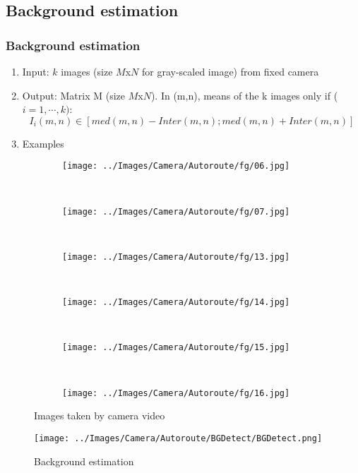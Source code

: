 \subsection{Background estimation}
\begin{frame}[allowframebreaks]
	\frametitle{Background estimation }
	\begin{enumerate}
	\item Input: $k$ images (size $M$x$N$ for gray-scaled image) from fixed camera
	\item Output: Matrix M (size $M$x$N$). In (m,n), means  of the k images only if ($i = 1,\cdots, k)$:	
	$$I_i (m,n) \in [med(m,n) - Inter(m,n); med(m,n) + Inter(m,n)]$$
    \item Examples
	\end{enumerate}

\begin{figure}[h]
\centering
\begin{subfigure}{0.20\textwidth}
\texttt{[image: ../Images/Camera/Autoroute/fg/06.jpg]}
\end{subfigure}
~
\begin{subfigure}{0.20\textwidth}
\texttt{[image: ../Images/Camera/Autoroute/fg/07.jpg]}
\end{subfigure}
~
\begin{subfigure}{0.20\textwidth}
\texttt{[image: ../Images/Camera/Autoroute/fg/13.jpg]}
\end{subfigure}
~
\begin{subfigure}{0.20\textwidth}
\texttt{[image: ../Images/Camera/Autoroute/fg/14.jpg]}
\end{subfigure}
~
\begin{subfigure}{0.20\textwidth}
\texttt{[image: ../Images/Camera/Autoroute/fg/15.jpg]}
\end{subfigure}
~
\begin{subfigure}{0.20\textwidth}
\texttt{[image: ../Images/Camera/Autoroute/fg/16.jpg]}
\end{subfigure}
\caption{Images taken by camera video}
\label{fig:AllAut}
\end{figure}

\begin{figure}[h]
\centering
\texttt{[image: ../Images/Camera/Autoroute/BGDetect/BGDetect.png]}
\caption{Background estimation}
\label{fig:AutBG} 
\end{figure} 

\end{frame}

